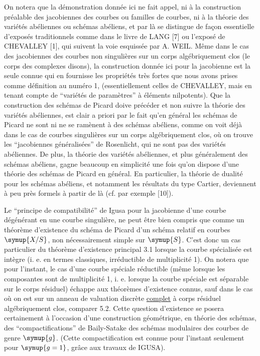  On notera que la démonstration donnée ici ne fait appel,
ni à la construction préalable des jacobiennes des courbes ou familles de
courbes, ni à la théorie des variétés abéliennes ou schémas abéliens, et par là
se distingue de façon essentielle d'exposés traditionnels comme dans le livre
de LANG [7] ou l'exposé de CHEVALLEY [1], qui suivent la voie esquissée par
A. WEIL. Même dans le cas des jacobiennes des courbes non singulières sur un
corps algébriquement clos (le corps des complexes disons), la construction
donnée ici pour la jacobienne est la seule connue qui en fournisse les
propriétés très fortes que nous avons prises comme définition au numéro 1,
(essentiellement celles de CHEVALLEY, mais en tenant compte de ``variétés de
paramètres'' à éléments nilpotents). Que la construction des schémas de Picard
doive précéder et non suivre la théorie des variétés abéliennes, est clair a
priori par le fait qu'en général les schémas de Picard ne sont ni ne se
ramènent à des schémas abéliens, comme on voit déjà dans le cas de courbes
singulières sur un corps algébriquement clos, où on trouve les ``jacobiennes
généralisées'' de Rosenlicht, qui ne sont pas des variétés abéliennes. De plus,
la théorie des variétés abéliennes, et plus généralement des schémas abéliens,
gagne beaucoup en simplicité une fois qu'on dispose d'une théorie des schémas
de Picard en général. En particulier, la théorie de dualité pour les schémas
abéliens, et notamment les résultats du type Cartier, deviennent à peu près
formels à partir de là (cf. par exemple [10]).

 Le ``principe de compatibilité'' de Igusa pour la
jacobienne d'une courbe dégénérant en une courbe singulière, ne peut être bien
compris que comme un théorème d'existence du schéma de Picard d'un schéma
relatif en courbes $\symup{X/S}$, non nécessairement simple sur $\symup{S}$. C'est donc un cas
particulier du théorème d'existence principal 3.1 lorsque la courbe spécialisée
est intègre (i. e. en termes classiques, irréductible de multiplicité 1). On
notera que pour l'instant, le cas d'une courbe spéciale réductible (même
lorsque les composantes sont de multiplicité 1, i. e. lorsque la courbe spéciale
est séparable sur le corps résiduel) échappe aux théorèmes d'existence connus,
sauf dans le cas où on est sur un anneau de valuation discrète \uline{complet} à corps
résiduel algébriquement clos, comparer 5.2. Cette question d'existence se posera
certainement à l'occasion d'une construction géométrique, en théorie des
schémas, des ``compactifications'' de Baily-Satake des schémas modulaires des
courbes de genre $\symup{g}$. (Cette compactification est connue pour l'instant
seulement pour $\symup{g=1}$, grâce aux travaux de IGUSA).

